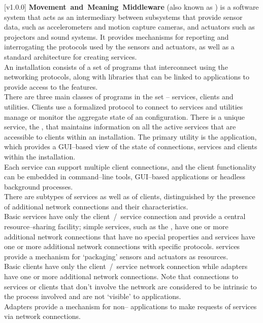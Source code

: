 [v1.0.0]
\textbf{Movement~and~Meaning~Middleware} (also known as \mplusm{}) is a software system
that acts as an intermediary between subsystems that provide sensor data, such as
accelerometers and motion capture cameras, and actuators such as projectors and sound
systems.
It provides mechanisms for reporting and interrogating the protocols used by the sensors
and actuators, as well as a standard architecture for creating services.\\

An \mplusm{} installation consists of a set of programs that interconnect using the
 networking
protocols, along with libraries that can be linked to applications to provide access to
the \mplusm{} features.\\

There are three main classes of programs in the set -- services, clients and utilities.
Clients use a formalized protocol to connect to services and utilities manage or monitor
the aggregate state of an \mplusm{} configuration.
There is a unique service, the , that
maintains information on all the active services that are accessible to clients within an
\mplusm{} installation.
The primary utility is the  application,
which provides a GUI--based view of the state of connections, services and clients within
the installation.\\

Each service can support multiple client connections, and the client functionality can be
embedded in command--line tools, GUI--based applications or headless background
processes.\\

There are subtypes of services as well as of clients, distinguished by the presence of
additional \yarp{} network connections and their characteristics.\\

Basic services have only the client~/~service \yarp{} connection and provide a central
resource--sharing facility; simple services, such as the
, have one or more additional \yarp{}
network connections that have no special properties and  services have one
or more additional \yarp{} network connections with specific protocols.
 services provide a mechanism for `packaging' sensors and actuators as
\mplusm{} resources.\\

Basic clients have only the client~/~service \yarp{} network connection while adapters
have one or more additional \yarp{} network connections.
Note that connections to services or clients that don't involve the \yarp{} network are
considered to be intrinsic to the process involved and are not `visible' to \mplusm{}
applications.\\

Adapters provide a mechanism for non--\mplusm{} applications to make requests of \mplusm{}
services via \yarp{} network connections.
\primaryEnd{}
